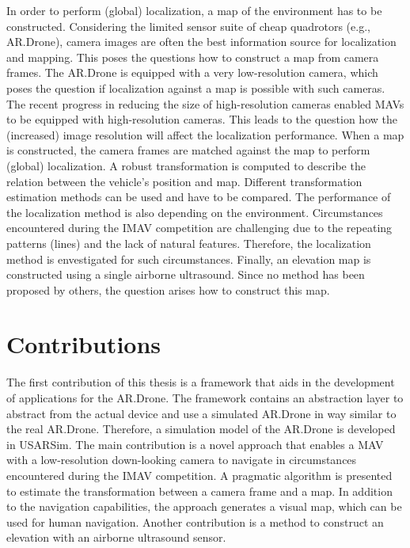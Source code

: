 In order to perform (global) localization, a map of the environment has to be constructed.
Considering the limited sensor suite of cheap quadrotors (e.g., AR.Drone), camera images are often the best information source for localization and mapping.
This poses the questions how to construct a map from camera frames.
The AR.Drone is equipped with a very low-resolution camera, which poses the question if localization against a map is possible with such cameras.
The recent progress in reducing the size of high-resolution cameras enabled MAVs to be equipped with high-resolution cameras.
This leads to the question how the (increased) image resolution will affect the localization performance.
When a map is constructed, the camera frames are matched against the map to perform (global) localization.
A robust transformation is computed to describe the relation between the vehicle's position and map.
Different transformation estimation methods can be used and have to be compared.
The performance of the localization method is also depending on the environment.
Circumstances encountered during the IMAV competition are challenging due to the repeating patterns (lines) and the lack of natural features.
Therefore, the localization method is envestigated for such circumstances.
Finally, an elevation map is constructed using a single airborne ultrasound.
Since no method has been proposed by others, the question arises how to construct this map.





\section{Contributions}
The first contribution of this thesis is a framework that aids in the development of applications for the AR.Drone.
The framework contains an abstraction layer to abstract from the actual device and use a simulated AR.Drone in way similar to the real AR.Drone.
Therefore, a simulation model of the AR.Drone is developed in USARSim.
The main contribution is a novel approach that enables a MAV with a low-resolution down-looking camera to navigate in circumstances encountered during the IMAV competition.
A pragmatic algorithm is presented to estimate the transformation between a camera frame and a map.
In addition to the navigation capabilities, the approach generates a visual map, which can be used for human navigation.
Another contribution is a method to construct an elevation with an airborne ultrasound sensor.

